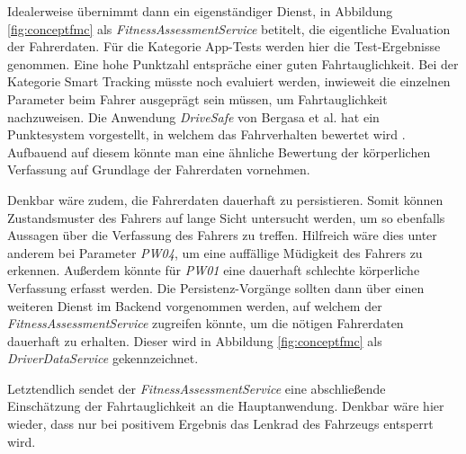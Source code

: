 Idealerweise übernimmt dann ein eigenständiger Dienst, in Abbildung \ref{fig:conceptfmc} als \textit{FitnessAssessmentService} betitelt, die eigentliche Evaluation der Fahrerdaten. Für die Kategorie App-Tests werden hier die Test-Ergebnisse genommen. Eine hohe Punktzahl entspräche einer guten Fahrtauglichkeit. Bei der Kategorie Smart Tracking müsste noch evaluiert werden, inwieweit die einzelnen Parameter beim Fahrer ausgeprägt sein müssen, um Fahrtauglichkeit nachzuweisen. Die Anwendung \textit{DriveSafe} von Bergasa et al. hat ein Punktesystem vorgestellt, in welchem das Fahrverhalten bewertet wird \cite{drivesafe}. Aufbauend auf diesem könnte man eine ähnliche Bewertung der körperlichen Verfassung auf Grundlage der Fahrerdaten vornehmen. 

Denkbar wäre zudem, die Fahrerdaten dauerhaft zu persistieren. Somit können Zustandsmuster des Fahrers auf lange Sicht untersucht werden, um so ebenfalls Aussagen über die Verfassung des Fahrers zu treffen. Hilfreich wäre dies unter anderem bei Parameter \textit{PW04}, um eine auffällige Müdigkeit des Fahrers zu erkennen. Außerdem könnte für \textit{PW01} eine dauerhaft schlechte körperliche Verfassung erfasst werden. Die Persistenz-Vorgänge sollten dann über einen weiteren Dienst im Backend vorgenommen werden, auf welchem der \textit{FitnessAssessmentService} zugreifen könnte, um die nötigen Fahrerdaten dauerhaft zu erhalten. Dieser wird in Abbildung \ref{fig:conceptfmc} als \textit{DriverDataService} gekennzeichnet.

Letztendlich sendet der \textit{FitnessAssessmentService} eine abschließende Einschätzung der Fahrtauglichkeit an die Hauptanwendung. Denkbar wäre hier wieder, dass nur bei positivem Ergebnis das Lenkrad des Fahrzeugs entsperrt wird. 
